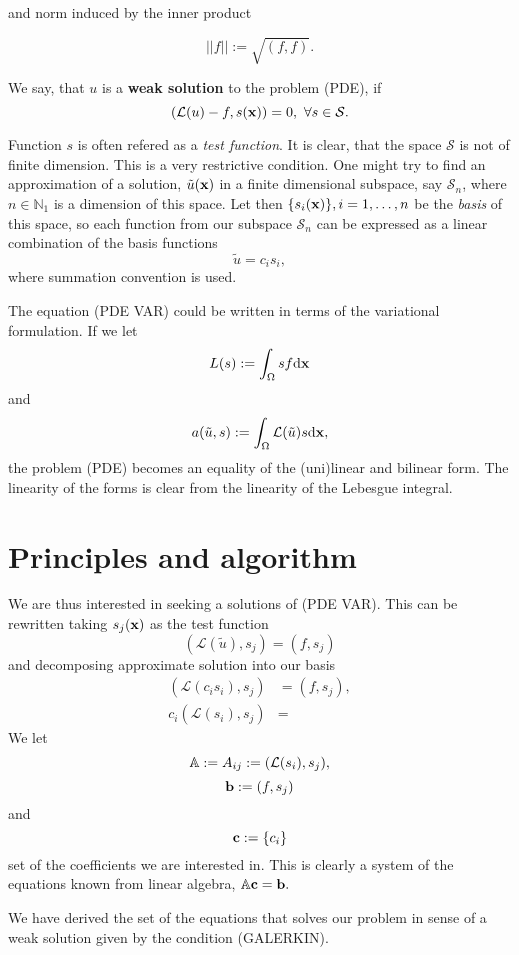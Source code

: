 and norm induced by the inner product

$$||f|| := \sqrt{( f, f )}.$$

We say, that $u$ is a \textbf{weak solution} to the problem (PDE), if
$$ ( \mathcal{L}(u) - f, s(\mathbf{x})) = 0,~\forall s \in \mathcal{S}. $$

\par Function $s$ is often refered as a \textit{test function}. It is clear, that the space $\mathcal{S}$ is not of finite dimension. This is a very restrictive condition. 
One might try to find an approximation of a solution, $\tilde u(\mathbf{x})$ in a finite dimensional subspace, say $\mathcal{S}_n$, where $n \in \mathbb{N}_1$ is a dimension of this space. Let then $\{s_i(\mathbf{x})\}, i=1,\ldots,n$
be the \textit{basis} of this space, so each function from our subspace $\mathcal{S}_n$ can be expressed as a linear combination of the basis functions
$$ \tilde u = c_i s_i,$$
where summation convention is used.

\par The equation (PDE VAR) could be written in terms of the variational formulation. If we let
$$ L(s) := \int_\Omega sf \mathrm d \mathbf{x} $$
and
$$ a(\tilde u, s) := \int_\Omega \mathcal L (\tilde u) s \mathrm d \mathbf{x}, $$
the problem (PDE) becomes an equality of the (uni)linear and bilinear form. The linearity of the forms is clear from the linearity of the Lebesgue integral. 

\section{Principles and algorithm}

\par We are thus interested in seeking a solutions of (PDE VAR). This can be rewritten taking $s_j(\mathbf{x})$ as the test function
$$ ( \mathcal L (\tilde u), s_j ) = (f, s_j ) $$
and decomposing approximate solution into our basis
\begin{align*}
( \mathcal L (c_i s_i), s_j) &= (f, s_j), \\
c_i ( \mathcal L (s_i), s_j) &= 
\end{align*}
We let
$$ \mathbb{A} := A_{ij} := (\mathcal L(s_i), s_j), $$
$$ \mathbf{b} := (f, s_j) $$
and 
$$ \mathbf{c} := \{c_i\} $$
set of the coefficients we are interested in. This is clearly a system of the equations known from linear algebra, $\mathbb{A} \mathbf{c} = \mathbf{b}.$

\par We have derived the set of the equations that solves our problem in sense of a weak solution given by the condition (GALERKIN). 


